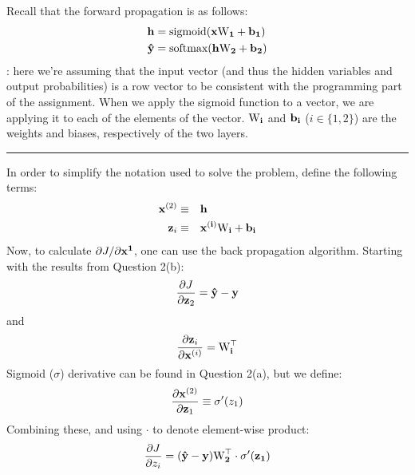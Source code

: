 \documentclass[letter,12pt]{article}
\begin{document}
\noindent Recall that the forward propagation is as follows:
\begin{align}
{\bf h}         & = \textrm{sigmoid}({\bf x\textrm{W}_{1} + b_{1}}) \\
{\bf \hat{y}} & = \textrm{softmax}({\bf h\textrm{W}_{2} + b_{2}})
\end{align}
: here we're assuming that the input vector (and thus the hidden variables and output probabilities)
is a row vector to be consistent with the programming part of the assignment. When we apply the sigmoid function to
a vector, we are applying it to each of the elements of the vector. $\bf{\textrm{W}}_i$ and $\bf{b}_{i}$ ($i\in\{1,2\}$) are
the weights and biases, respectively of the two layers.\vspace{5mm}

\noindent\rule{\textwidth}{0.4pt}\vspace{5mm}
In order to simplify the notation used to solve the problem, define the following terms:
\begin{align}
{\bf x}^{(2)} \equiv& \quad{\bf h} \\
{\bf z}_{i}     \equiv& \quad{\bf x^{(i)}\textrm{W}_{i} + b_{i}}
\end{align}
Now, to calculate $\partial{J}/\partial{\bf x^{1}}$, one can use the back propagation algorithm. Starting with the results from Question 2(b):
\begin{equation}
\frac{\partial{J}}{\partial{\bf z}_{2}} = \bf{\hat{y}} - \bf{y}
\end{equation}
and
\begin{equation}
\frac{\partial{\bf z}_{i}}{\partial{{\bf x}^{(i)}}} = {\bf \textrm{W}^{\top}_{i}}\label{eq: 2c 1}
\end{equation}
Sigmoid ($\sigma$) derivative can be found in Question 2(a), but we define:
\begin{equation}
\frac{\partial{{\bf x}^{(2)}}}{\partial{{\bf z}_{1}}}\equiv\sigma^{\prime}(z_{1})%
\end{equation}
Combining these, and using $\cdot$ to denote element-wise product:
\begin{equation}
\frac{\partial{J}}{\partial{z_{i}}} = (\bf{\hat{y}} - \bf{y}){\bf \textrm{W}^{\top}_{2}}\cdot\sigma^{\prime}(z_{1})
\end{equation}
\end{document}
